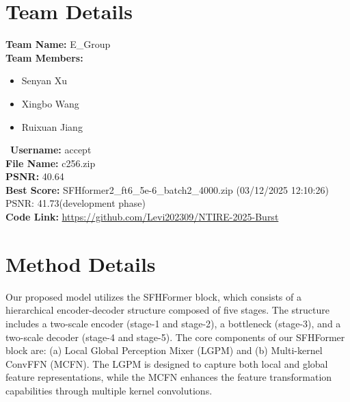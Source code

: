 \documentclass[10pt,twocolumn,letterpaper]{article}
\begin{document}
\section{Team Details}
\textbf{Team Name:} E\_Group\\
\textbf{Team Members:}
\begin{itemize}
	\item Senyan Xu
	\item Xingbo Wang
	\item Ruixuan Jiang 
\end{itemize}
\
\textbf{Username:} accept\\
\textbf{File Name:} 	c256.zip\\
\textbf{PSNR:} 40.64\\
\textbf{Best Score:} SFHformer2\_ft6\_5e-6\_batch2\_4000.zip (03/12/2025 12:10:26) PSNR: 41.73(development phase)\\
\textbf{Code Link:} \url{https://github.com/Levi202309/NTIRE-2025-Burst}

\section{Method Details}
Our proposed model utilizes the SFHFormer \cite{FFT1} block, which consists of a hierarchical encoder-decoder structure composed of five stages. The structure includes a two-scale encoder (stage-1 and stage-2), a bottleneck (stage-3), and a two-scale decoder (stage-4 and stage-5). The core components of our SFHFormer block are: (a) Local Global Perception Mixer (LGPM) and (b) Multi-kernel ConvFFN (MCFN). The LGPM is designed to capture both local and global feature representations, while the MCFN enhances the feature transformation capabilities through multiple kernel convolutions.
\end{document}

